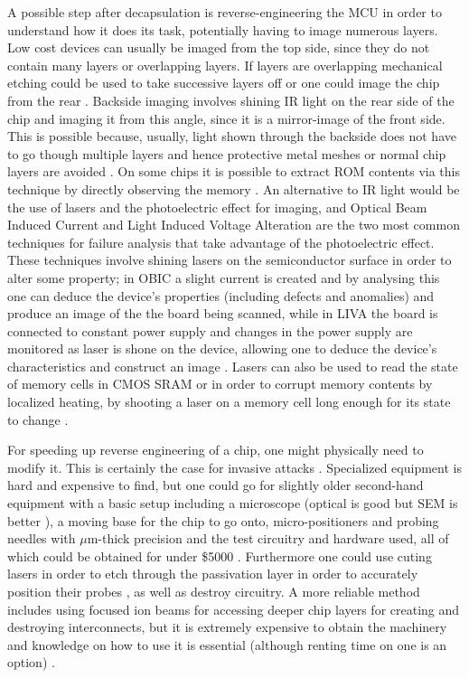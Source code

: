 	A possible step after decapsulation is reverse-engineering the MCU in order to understand how it does its task, potentially having to image numerous layers. Low cost devices can usually be imaged from the top side, since they do not contain many layers or overlapping layers. If layers are overlapping mechanical etching could be used to take successive layers off \citep{ic_decap} \citep{hwre} or one could image the chip from the rear \citep{hwre} \citep{sergei:thesis}. Backside imaging involves shining IR light on the rear side of the chip and imaging it from this angle, since it is a mirror-image of the front side. This is possible because, usually, light shown through the backside does not have to go though multiple layers and hence protective metal meshes or normal chip layers are avoided \citep{hwre}. On some chips it is possible to extract ROM contents via this technique by directly observing the memory \citep{sergei:thesis}. An alternative to IR light would be the use of lasers and the photoelectric effect for imaging, and Optical Beam Induced Current and Light Induced Voltage Alteration are the two most common techniques for failure analysis that take advantage of the photoelectric effect. These techniques involve shining lasers on the semiconductor surface in order to alter some property; in OBIC a slight current is created and by analysing this one can deduce the device's properties (including defects and anomalies) and produce an image of the the board being scanned, while in LIVA the board is connected to constant power supply and changes in the power supply are monitored as laser is shone on the device, allowing one to deduce the device's characteristics and construct an image \citep{cole:OBIC}. Lasers can also be used to read the state of memory cells in CMOS SRAM \citep{sergei:thesis} or in order to corrupt memory contents by localized heating, by shooting a laser on a memory cell long enough for its state to change \citep{website:riscure} \citep{sergei:thesis}.
	
	For speeding up reverse engineering of a chip, one might physically need to modify it. This is certainly the case for invasive attacks \citep{sergei:thesis} \citep{gutman:memory_remanence}. Specialized equipment is hard and expensive to find, but one could go for slightly older second-hand equipment with a basic setup including a microscope (optical is good but SEM is better \citep{sergei:thesis} \citep{hwre}), a moving base for the chip to go onto, micro-positioners and probing needles with $\mu$m-thick precision and the test circuitry and hardware used, all of which could be obtained for under \$5000 \citep{low_cost_probing} \citep{gutman:memory_remanence} \citep{sergei:thesis} \citep{hwre}. Furthermore one could use cuting lasers in order to etch through the passivation layer in order to accurately position their probes \citep{sergei:thesis}, as well as destroy circuitry. A more reliable method includes using focused ion beams for accessing deeper chip layers for creating and destroying interconnects, but it is extremely expensive to obtain the machinery and knowledge on how to use it is essential (although renting time on one is an option) \citep{sergei:thesis} \citep{hwre} \citep{gutman:memory_remanence}. 
